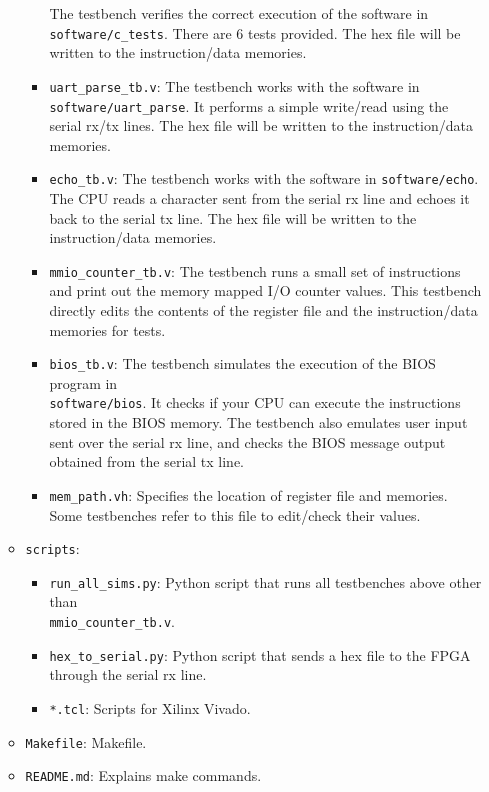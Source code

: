 \begin{itemize}
\begin{itemize}
\begin{itemize}
      The testbench verifies the correct execution of the software in \verb|software/c_tests|.
      There are 6 tests provided.
      The hex file will be written to the instruction/data memories.
    \item \verb|uart_parse_tb.v|:
      The testbench works with the software in \verb|software/uart_parse|.
      It performs a simple write/read using the serial rx/tx lines.
      The hex file will be written to the instruction/data memories.
    \item \verb|echo_tb.v|:
      The testbench works with the software in \verb|software/echo|.
      The CPU reads a character sent from the serial rx line and echoes it back to the serial tx line.
      The hex file will be written to the instruction/data memories.
    \item \verb|mmio_counter_tb.v|:
      The testbench runs a small set of instructions and print out the memory mapped I/O counter values.
      This testbench directly edits the contents of the register file and the instruction/data memories for tests.
    \item \verb|bios_tb.v|:
      The testbench simulates the execution of the BIOS program in \\ \verb|software/bios|.
      It checks if your CPU can execute the instructions stored in the BIOS memory.
      The testbench also emulates user input sent over the serial rx line,
      and checks the BIOS message output obtained from the serial tx line.
    \item \verb|mem_path.vh|:
      Specifies the location of register file and memories.
      Some testbenches refer to this file to edit/check their values.
    \end{itemize}
  \item \verb|scripts|:
    \begin{itemize}
      \item \verb|run_all_sims.py|:
        Python script that runs all testbenches above other than \\
        \verb|mmio_counter_tb.v|.
      \item \verb|hex_to_serial.py|:
        Python script that sends a hex file to the FPGA through the serial rx line.
      \item \verb|*.tcl|:
        Scripts for Xilinx Vivado.
    \end{itemize}
  \item \verb|Makefile|:
    Makefile.
  \item \verb|README.md|:
    Explains make commands.

\end{itemize}
\end{itemize}
